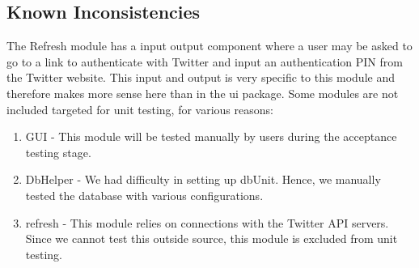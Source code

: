 \documentclass[a4paper, 12pt]{article}
\begin{document}
\subsection{Known Inconsistencies} \label{sec:known}
\begin{adjustwidth}{2em}{0pt}
The Refresh module has a input output component where a user may be asked to go to a link to authenticate with Twitter and input an authentication PIN from the Twitter website. This input and output is very specific to this module and therefore makes more sense here than in the ui package.
Some modules are not included targeted for unit testing, for various reasons:
\begin{enumerate}
\item GUI - This module will be tested manually by users during the acceptance testing stage.
\item DbHelper - We had difficulty in setting up dbUnit. Hence, we manually tested the database with various configurations.
\item refresh - This module relies on connections with the Twitter API servers. Since we cannot test this outside source, this module is excluded from unit testing.
\end{enumerate}
\end{adjustwidth}
\end{document}
